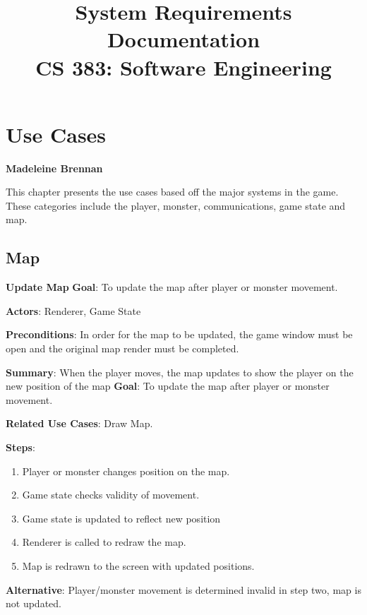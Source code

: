 \documentclass[12pt]{report}
\begin{document}
\title{System Requirements Documentation\\ \vspace{2 mm} {\large CS 383: Software Engineering}}
\maketitle
\clearpage

\chapter{Use Cases}
\textbf{Madeleine Brennan}

This chapter presents the use cases based off the major systems in the game. These categories
include the player, monster, communications, game state and map.

\section{Map}

\textbf{Update Map}
\textbf{Goal}: To update the map after player or monster movement.

\textbf{Actors}:
Renderer, Game State

\textbf{Preconditions}: In order for the map to be updated, the game window must
be open and the original map render must be completed.

\textbf{Summary}: 
When the player moves, the map updates to show the player on the new position of the map
\textbf{Goal}: To update the map after player or monster movement.

\textbf{Related Use Cases}: Draw Map.
	
\textbf{Steps}: 
\begin{enumerate}
	\item Player or monster changes position on the map.
	\item Game state checks validity of movement.
	\item Game state is updated to reflect new position
	\item Renderer is called to redraw the map.
	\item Map is redrawn to the screen with updated positions.
\end{enumerate}
	
\textbf{Alternative}: 
Player/monster movement is determined invalid in step two, map is not updated.
\end{document}
